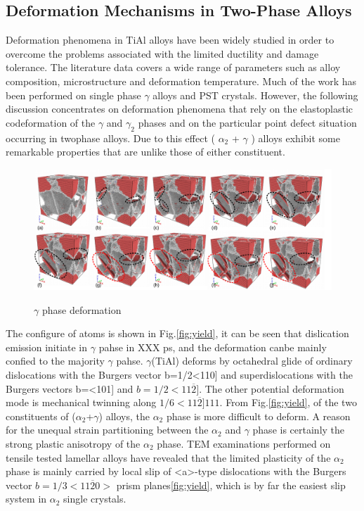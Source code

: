 \documentclass[journal,article,submit,moreauthors,pdftex,10pt,a4paper]{Definitions/mdpi}
\begin{document}
\subsection{Deformation Mechanisms in Two-Phase Alloys}
Deformation phenomena in TiAl alloys have been widely studied in order to overcome the problems associated with the limited ductility and damage tolerance. The literature data covers a wide range of parameters such as alloy composition, microstructure and deformation temperature. Much of the work has been performed on single phase $\gamma$ alloys and PST crystals. However, the following discussion concentrates on deformation phenomena that rely on the elastoplastic codeformation of the $\gamma$ and $\gamma_2$ phases and on the particular point defect situation occurring in twophase alloys. Due to this effect ( $\alpha_2$ + $\gamma$ ) alloys exhibit some remarkable properties that are unlike those of either constituent.
\begin{figure}[h]
		\centering
		\includegraphics[width=1\linewidth]{img/def-gamma}
		\label{fig:def-gamma}
		\caption{$\gamma$ phase deformation}
\end{figure}
The configure of atoms is shown in Fig.\ref{fig:yield}, it can be seen that dislication emission initiate in $\gamma$ pahse in XXX ps, and the deformation canbe mainly confied to the majority $\gamma$ pahse. $\gamma$(TiAl) deforms by octahedral glide of ordinary dislocations with the Burgers vector b=1/2<110] and superdislocations with the Burgers vectors b=<101] and $b=1/2<11\overline{2}]$. The other potential deformation mode is mechanical twinning along $1/6<11\overline{2}]{111}$.
From Fig.\ref{fig:yield}, of the two constituents of ($\alpha_2$+$\gamma$) alloys, the $\alpha_2$ phase is more difficult to deform. A reason for the unequal strain partitioning between the $\alpha_2$ and $\gamma$ phase is certainly the strong plastic anisotropy of the $\alpha_2$ phase. TEM examinations performed on tensile  tested lamellar alloys have revealed that the limited plasticity of the $\alpha_2$ phase is mainly carried by local slip of <a>-type dislocations with the Burgers vector $b=1/3<11\overline{2}0>$ prism planes\ref{fig:yield}, which is by far the easiest slip system in $\alpha_2$ single crystals. 
\end{document}

